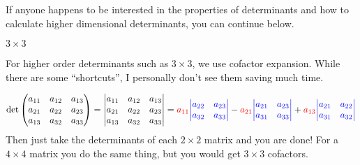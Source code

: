 \documentclass[reqno]{amsart}
\theoremstyle{definition}
\begin{document}
\pagebreak

If anyone happens to be interested in the properties of determinants and how to calculate higher dimensional determinants, you can continue below.

\underline{$3 \times 3$}

For higher order determinants such as $3 \times 3$, we use cofactor expansion.  While there are some
``shortcuts'', I personally don't see them saving much time.

\begin{equation}
\det \begin{pmatrix}
a_{11} & a_{12} & a_{13}\\
a_{21} & a_{22} & a_{23}\\
a_{13} & a_{32} & a_{33}
\end{pmatrix} = \begin{vmatrix}
a_{11} & a_{12} & a_{13}\\
a_{21} & a_{22} & a_{23}\\
a_{13} & a_{32} & a_{33}
\end{vmatrix} = {\color{red}a_{11}}{\color{blue}\begin{vmatrix}
a_{22} & a_{23}\\
a_{32} & a_{33}
\end{vmatrix}}
-  {\color{red}a_{21}}{\color{blue}\begin{vmatrix}
a_{21} & a_{23}\\
a_{31} & a_{33}
\end{vmatrix}} + {\color{red}a_{13}}{\color{blue}\begin{vmatrix}
a_{21} & a_{22}\\
a_{31} & a_{32}
\end{vmatrix}}
\end{equation}
%
Then just take the determinants of each $2 \times 2$ matrix and you are done!
For a $4 \times 4$ matrix you do the same thing, but you would get $3 \times 3$ cofactors.
\end{document}
